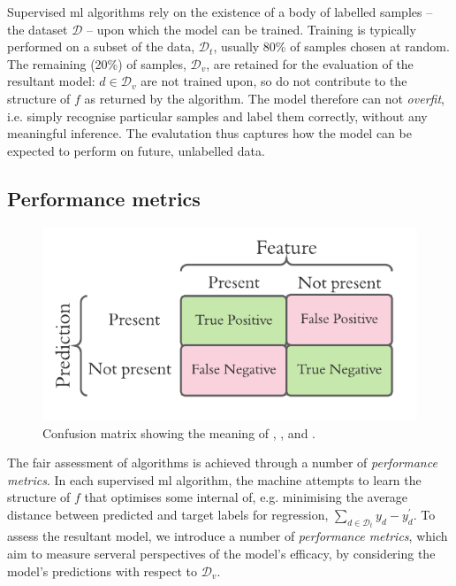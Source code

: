 \par 

Supervised \gls{ml} algorithms rely on the existence of a body of labelled samples 
    -- the dataset $\mathcal{D}$ -- upon which the model can be trained.
Training is typically performed on a subset of the data, $\mathcal{D}_t$, usually 80\% of samples chosen at random. 
The remaining (20\%) of samples, $\mathcal{D}_v$, are retained for the evaluation of the resultant model: 
    $d \in \mathcal{D}_v$ are not trained upon, so do not contribute to the structure of $f$ as returned by the algorithm.
    The model therefore can not \emph{overfit}, i.e. simply recognise particular samples and label them correctly,
    without any meaningful inference. 
The evalutation thus captures how the model can be expected to perform on future, unlabelled data. 
\par 

\subsection{Performance metrics}\label{sec:performance_metrics}
\begin{figure}
    \begin{center}
        \includegraphics{contextual_review/figures/confusion_matrix.pdf}
    \end{center}
    \caption[Confusion matrix]{
        Confusion matrix showing the meaning of 
        , ,  and .
    }
    \label{fig:confusion_matrix}
\end{figure}
The fair assessment of algorithms is achieved through a number of \emph{performance metrics}.
In each supervised \gls{ml} algorithm, the machine attempts to learn the structure of $f$ that optimises some internal \gls{of}, 
    e.g. minimising the average distance between predicted and target labels for regression, $\sum\limits_{d \in \mathcal{D}_t} y_d - y^{\prime}_d$.
To assess the resultant model, we introduce a number of \emph{performance metrics}, 
    which aim to measure serveral perspectives of the model's efficacy, by considering the model's predictions with respect to $\mathcal{D}_v$. 
\par 


